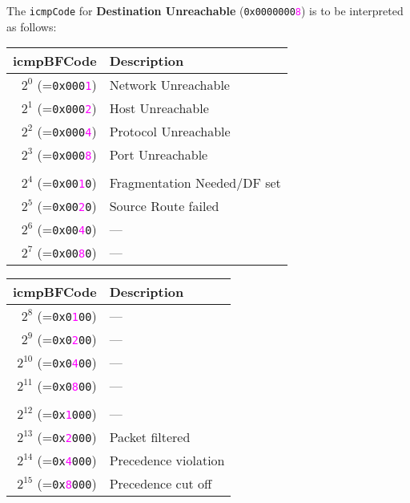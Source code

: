 \documentclass[documentation]{subfiles}
\begin{document}
~\\\\
The {\tt icmpCode} for {\bf Destination Unreachable} ({\tt 0x0000000\textcolor{magenta}{8}}) is to be interpreted as follows:\\
\begin{minipage}{0.45\textwidth}
    \begin{longtable} {rl}
        \toprule
        {\bf icmpBFCode} & {\bf Description}\\
        \midrule\endhead%
        $2^0$ (={\tt 0x000\textcolor{magenta}{1}}) & Network Unreachable \\
        $2^1$ (={\tt 0x000\textcolor{magenta}{2}}) & Host Unreachable \\
        $2^2$ (={\tt 0x000\textcolor{magenta}{4}}) & Protocol Unreachable \\
        $2^3$ (={\tt 0x000\textcolor{magenta}{8}}) & Port Unreachable \\
        \\
        $2^4$ (={\tt 0x00\textcolor{magenta}{1}0}) & Fragmentation Needed/DF set \\
        $2^5$ (={\tt 0x00\textcolor{magenta}{2}0}) & Source Route failed \\
        $2^6$ (={\tt 0x00\textcolor{magenta}{4}0}) & --- \\
        $2^7$ (={\tt 0x00\textcolor{magenta}{8}0}) & --- \\
        \bottomrule
    \end{longtable}
\end{minipage}
\hfill
\begin{minipage}{0.45\textwidth}
    \begin{longtable} {rl}
        \toprule
        {\bf icmpBFCode} & {\bf Description}\\
        \midrule\endhead%
        $2^{8}$  (={\tt 0x0\textcolor{magenta}{1}00}) & --- \\
        $2^{9}$  (={\tt 0x0\textcolor{magenta}{2}00}) & --- \\
        $2^{10}$ (={\tt 0x0\textcolor{magenta}{4}00}) & --- \\
        $2^{11}$ (={\tt 0x0\textcolor{magenta}{8}00}) & --- \\
        \\
        $2^{12}$ (={\tt 0x\textcolor{magenta}{1}000}) & --- \\
        $2^{13}$ (={\tt 0x\textcolor{magenta}{2}000}) & Packet filtered \\
        $2^{14}$ (={\tt 0x\textcolor{magenta}{4}000}) & Precedence violation \\
        $2^{15}$ (={\tt 0x\textcolor{magenta}{8}000}) & Precedence cut off \\
        \bottomrule
    \end{longtable}
\end{minipage}
\end{document}
